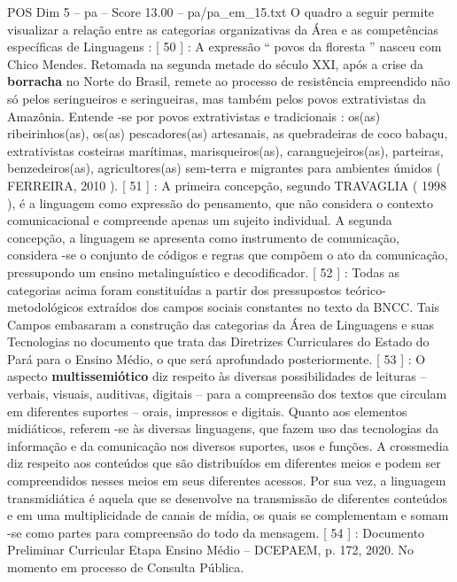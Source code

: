 \begin{textsample}{POS Dim 5 – pa – Score 13.00 – pa/pa\_em\_15.txt}
O quadro a seguir permite visualizar a relação entre as categorias organizativas da Área e as competências específicas de Linguagens : [ 50 ] : A expressão “ povos da floresta ” nasceu com Chico Mendes.
Retomada na segunda metade do século XXI, após a crise da \textbf{borracha} no Norte do Brasil, remete ao processo de resistência empreendido não só pelos seringueiros e seringueiras, mas também pelos povos extrativistas da Amazônia.
Entende -se por povos extrativistas e tradicionais : os(as) ribeirinhos(as), os(as) pescadores(as) artesanais, as quebradeiras de coco babaçu, extrativistas costeiras marítimas, marisqueiros(as), caranguejeiros(as), parteiras, benzedeiros(as), agricultores(as) sem-terra e migrantes para ambientes úmidos ( FERREIRA, 2010 ). [ 51 ] : A primeira concepção, segundo TRAVAGLIA ( 1998 ), é a linguagem como expressão do pensamento, que não considera o contexto comunicacional e compreende apenas um sujeito individual.
A segunda concepção, a linguagem se apresenta como instrumento de comunicação, considera -se o conjunto de códigos e regras que compõem o ato da comunicação, pressupondo um ensino metalinguístico e decodificador. [ 52 ] : Todas as categorias acima foram constituídas a partir dos pressupostos teórico-metodológicos extraídos dos campos sociais constantes no texto da BNCC.
Tais Campos embasaram a construção das categorias da Área de Linguagens e suas Tecnologias no documento que trata das Diretrizes Curriculares do Estado do Pará para o Ensino Médio, o que será aprofundado posteriormente. [ 53 ] : O aspecto \textbf{multissemiótico} diz respeito às diversas possibilidades de leituras – verbais, visuais, auditivas, digitais – para a compreensão dos textos que circulam em diferentes suportes – orais, impressos e digitais.
Quanto aos elementos midiáticos, referem -se às diversas linguagens, que fazem uso das tecnologias da informação e da comunicação nos diversos suportes, usos e funções.
A crossmedia diz respeito aos conteúdos que são distribuídos em diferentes meios e podem ser compreendidos nesses meios em seus diferentes acessos.
Por sua vez, a linguagem transmidiática é aquela que se desenvolve na transmissão de diferentes conteúdos e em uma multiplicidade de canais de mídia, os quais se complementam e somam -se como partes para compreensão do todo da mensagem. [ 54 ] : Documento Preliminar Curricular Etapa Ensino Médio – DCEPAEM, p. 172, 2020.
No momento em processo de Consulta Pública.

\end{textsample}
